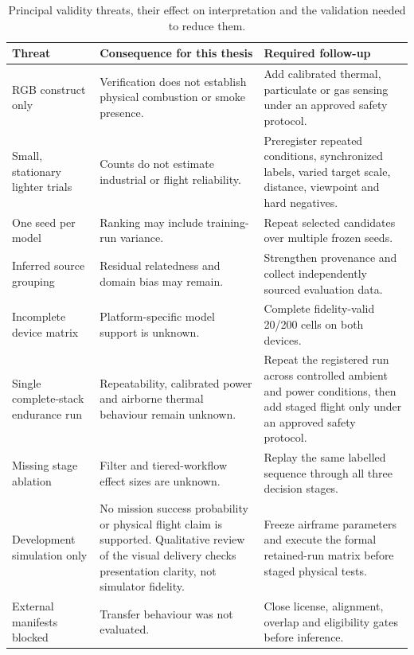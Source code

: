 \begin{table}[H]
  \centering
  \caption{Principal validity threats, their effect on interpretation and the
  validation needed to reduce them.}
  \label{tab:validity-followup}
  \scriptsize
  \begin{tabularx}{\textwidth}{@{}p{}p{}X@{}}
    \toprule
    Threat & Consequence for this thesis & Required follow-up \\
    \midrule
    RGB construct only & Verification does not establish physical combustion
    or smoke presence. & Add calibrated thermal, particulate or gas sensing
    under an approved safety protocol. \\
    Small, stationary lighter trials & Counts do not estimate industrial or
    flight reliability. & Preregister repeated conditions, synchronized
    labels, varied target scale, distance, viewpoint and hard negatives. \\
    One seed per model & Ranking may include training-run variance. & Repeat
    selected candidates over multiple frozen seeds. \\
    Inferred source grouping & Residual relatedness and domain bias may remain.
    & Strengthen provenance and collect independently sourced evaluation data. \\
    Incomplete device matrix & Platform-specific model support is unknown. &
    Complete fidelity-valid 20/200 cells on both devices. \\
    Single complete-stack endurance run & Repeatability, calibrated power and
    airborne thermal behaviour remain unknown. & Repeat the registered run
    across controlled ambient and power conditions, then add staged flight only
    under an approved safety protocol. \\
    Missing stage ablation & Filter and tiered-workflow effect sizes are unknown. &
    Replay the same labelled sequence through all three decision stages. \\
    Development simulation only & No mission success probability or physical
    flight claim is supported. Qualitative review of the visual delivery checks
    presentation clarity, not simulator fidelity. & Freeze airframe parameters
    and execute the formal retained-run matrix before staged physical tests. \\
    External manifests blocked & Transfer behaviour was not evaluated. & Close
    license, alignment, overlap and eligibility gates before inference. \\
    \bottomrule
  \end{tabularx}
\end{table}

